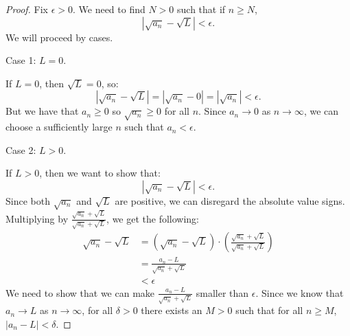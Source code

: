 \documentclass[12pt]{amsart}
\begin{document}
\begin{enumerate}
\begin{proof}
Fix $\epsilon>0$. We need to find $N>0$ such that if $n\ge N$,
\[ \left| \sqrt{a_n} - \sqrt{L}\right| < \epsilon.\]
We will proceed by cases.

Case 1: $L=0$.

 If $L=0$, then $\sqrt L = 0$, so:
\[ \left| \sqrt{a_n} - \sqrt{L}\right| = \left| \sqrt{a_n} - 0\right| = |\sqrt {a_n}| < \epsilon.\]
But we have that $a_n \ge 0$ so $\sqrt {a_n} \ge 0$ for all $n$. Since $a_n\to 0$ as $n\to \infty$, we can choose a sufficiently large $n$ such that $a_n < \epsilon$.

Case 2: $L>0$.

If $L>0$, then we want to show that:
 \[ \left| \sqrt{a_n} - \sqrt{L}\right| < \epsilon.\]
Since both $\sqrt{a_n}$ and $\sqrt L$ are positive, we can disregard the absolute value signs. Multiplying by $\frac {\sqrt{a_n} + \sqrt{L}}{\sqrt{a_n} + \sqrt{L}}$, we get the following:
\begin{align*}
\sqrt{a_n} - \sqrt{L}&= \left(\sqrt{a_n} - \sqrt{L}\right)\cdot \left(\frac {\sqrt{a_n} + \sqrt{L}}{\sqrt{a_n} + \sqrt{L}}\right) \\
&= \frac {a_n - L} {\sqrt{a_n} + \sqrt{L}}
\\&< \epsilon
\end{align*}
We need to show that we can make $\frac {a_n - L} {\sqrt{a_n} + \sqrt{L}}$ smaller than $\epsilon$. Since we know that $a_n\rightarrow L$ as $n\rightarrow \infty$, for all $\delta > 0$ there exists an $M>0$ such that for all $n\ge M$, $|a_n - L| < \delta$.
\end{proof}
\end{enumerate}
\end{document}
